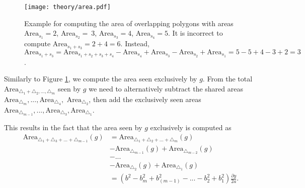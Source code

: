 \begin{figure}[h!]
    \centering
    \texttt{[image: theory/area.pdf]}
    \caption{Example for computing the area of overlapping polygons with areas $\text{Area}_{s_1} = 2$, $\text{Area}_{s_2} =~3$, $\text{Area}_{s_3} = 4$, $\text{Area}_{s_4} = 5$. It is incorrect to compute $\text{Area}_{s_1 + s_3} = 2 + 4 = 6$. Instead, $\text{Area}_{s_1 + s_3} = \text{Area}_{s_1 + s_2 + s_3 + s_4} - \text{Area}_{s_4} + \text{Area}_{s_3} - \text{Area}_{s_2} + \text{Area}_{s_1} = 5 - 5 + 4 - 3 + 2 = 3$.}
    \label{fig:areas}
\end{figure}

Similarly to Figure \ref{fig:areas}, we  compute the area seen exclusively by $g$. From the total $\text{Area}_{\triangle_1 + \triangle_2, ..., \triangle_m}$ seen by $g$ we need to alternatively subtract the shared areas $\text{Area}_{\triangle_m}, ..., \text{Area}_{\triangle_4},$ $\text{Area}_{\triangle_2}$, then add the exclusively seen areas $\text{Area}_{\triangle_{m - 1}}, ..., \text{Area}_{\triangle_3}, \text{Area}_{\triangle_1}$.


This results in the fact that the area seen by $g$ exclusively is computed as 
\begin{align*}
    \text{Area}_{\triangle_1 + \triangle_3 + ... + \triangle_{m - 1}}(g) &= \text{Area}_{\triangle_1 + \triangle_2 + ... + \triangle_m}(g) \\
    &- \text{Area}_{\triangle_{m - 1}}(g) + \text{Area}_{\triangle_{m - 2}}(g) \\
    &- ... \\
    &- \text{Area}_{\triangle_2}(g) + \text{Area}_{\triangle_1}(g) \\
                                                                         &= \left(b^2 - b_{m}^2 + b_{(m - 1)}^2 - ... - b_{2}^2 + b_{1}^2\right)\frac{\partial y}{2a}.
\end{align*}


